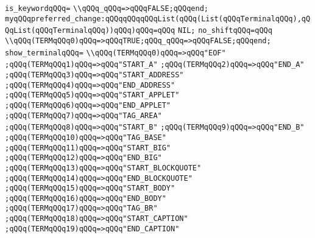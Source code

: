 \verb|is_keywordqQQq=|\newline
\verb|\\qQQq_qQQq=>qQQqFALSE;qQQqend;|\newline
\verb|myqQQqpreferred_change:qQQqqQQqqQQqList(qQQq(List(qQQqTerminalqQQq),qQQqList(qQQqTerminalqQQq))qQQq)qQQq=qQQq|\newline
\verb|NIL;|\newline
\verb|no_shiftqQQq=qQQq|\newline
\verb|\\qQQq(TERMqQQq0)qQQq=>qQQqTRUE;qQQq_qQQq=>qQQqFALSE;qQQqend;|\newline
\verb|show_terminalqQQq=|\newline
\verb|\\qQQq(TERMqQQq0)qQQq=>qQQq"EOF"|\newline
\verb|;qQQq(TERMqQQq1)qQQq=>qQQq"START_A"|\newline
\verb|;qQQq(TERMqQQq2)qQQq=>qQQq"END_A"|\newline
\verb|;qQQq(TERMqQQq3)qQQq=>qQQq"START_ADDRESS"|\newline
\verb|;qQQq(TERMqQQq4)qQQq=>qQQq"END_ADDRESS"|\newline
\verb|;qQQq(TERMqQQq5)qQQq=>qQQq"START_APPLET"|\newline
\verb|;qQQq(TERMqQQq6)qQQq=>qQQq"END_APPLET"|\newline
\verb|;qQQq(TERMqQQq7)qQQq=>qQQq"TAG_AREA"|\newline
\verb|;qQQq(TERMqQQq8)qQQq=>qQQq"START_B"|\newline
\verb|;qQQq(TERMqQQq9)qQQq=>qQQq"END_B"|\newline
\verb|;qQQq(TERMqQQq10)qQQq=>qQQq"TAG_BASE"|\newline
\verb|;qQQq(TERMqQQq11)qQQq=>qQQq"START_BIG"|\newline
\verb|;qQQq(TERMqQQq12)qQQq=>qQQq"END_BIG"|\newline
\verb|;qQQq(TERMqQQq13)qQQq=>qQQq"START_BLOCKQUOTE"|\newline
\verb|;qQQq(TERMqQQq14)qQQq=>qQQq"END_BLOCKQUOTE"|\newline
\verb|;qQQq(TERMqQQq15)qQQq=>qQQq"START_BODY"|\newline
\verb|;qQQq(TERMqQQq16)qQQq=>qQQq"END_BODY"|\newline
\verb|;qQQq(TERMqQQq17)qQQq=>qQQq"TAG_BR"|\newline
\verb|;qQQq(TERMqQQq18)qQQq=>qQQq"START_CAPTION"|\newline
\verb|;qQQq(TERMqQQq19)qQQq=>qQQq"END_CAPTION"|\newline
